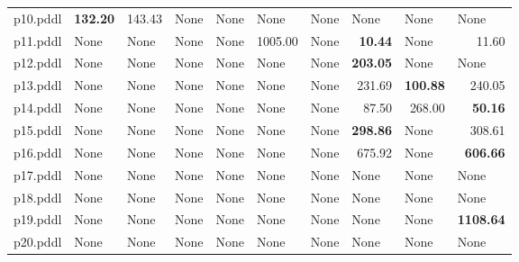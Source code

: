 \documentclass{article}
\begin{document}
\begin{tabular}{@{}lrrrrrrrrr@{}}
p10.pddl & \textbf{132.20} & 143.43 & \multicolumn{1}{|l|}{None} & \multicolumn{1}{|l|}{None} & \multicolumn{1}{|l|}{None} & \multicolumn{1}{|l|}{None} & \multicolumn{1}{|l|}{None} & \multicolumn{1}{|l|}{None} & \multicolumn{1}{|l|}{None} \\
p11.pddl & \multicolumn{1}{|l|}{None} & \multicolumn{1}{|l|}{None} & \multicolumn{1}{|l|}{None} & \multicolumn{1}{|l|}{None} & 1005.00 & \multicolumn{1}{|l|}{None} & \textbf{10.44} & \multicolumn{1}{|l|}{None} & 11.60 \\
p12.pddl & \multicolumn{1}{|l|}{None} & \multicolumn{1}{|l|}{None} & \multicolumn{1}{|l|}{None} & \multicolumn{1}{|l|}{None} & \multicolumn{1}{|l|}{None} & \multicolumn{1}{|l|}{None} & \textbf{203.05} & \multicolumn{1}{|l|}{None} & \multicolumn{1}{|l|}{None} \\
p13.pddl & \multicolumn{1}{|l|}{None} & \multicolumn{1}{|l|}{None} & \multicolumn{1}{|l|}{None} & \multicolumn{1}{|l|}{None} & \multicolumn{1}{|l|}{None} & \multicolumn{1}{|l|}{None} & 231.69 & \textbf{100.88} & 240.05 \\
p14.pddl & \multicolumn{1}{|l|}{None} & \multicolumn{1}{|l|}{None} & \multicolumn{1}{|l|}{None} & \multicolumn{1}{|l|}{None} & \multicolumn{1}{|l|}{None} & \multicolumn{1}{|l|}{None} & 87.50 & 268.00 & \textbf{50.16} \\
p15.pddl & \multicolumn{1}{|l|}{None} & \multicolumn{1}{|l|}{None} & \multicolumn{1}{|l|}{None} & \multicolumn{1}{|l|}{None} & \multicolumn{1}{|l|}{None} & \multicolumn{1}{|l|}{None} & \textbf{298.86} & \multicolumn{1}{|l|}{None} & 308.61 \\
p16.pddl & \multicolumn{1}{|l|}{None} & \multicolumn{1}{|l|}{None} & \multicolumn{1}{|l|}{None} & \multicolumn{1}{|l|}{None} & \multicolumn{1}{|l|}{None} & \multicolumn{1}{|l|}{None} & 675.92 & \multicolumn{1}{|l|}{None} & \textbf{606.66} \\
p17.pddl & \multicolumn{1}{|l|}{None} & \multicolumn{1}{|l|}{None} & \multicolumn{1}{|l|}{None} & \multicolumn{1}{|l|}{None} & \multicolumn{1}{|l|}{None} & \multicolumn{1}{|l|}{None} & \multicolumn{1}{|l|}{None} & \multicolumn{1}{|l|}{None} & \multicolumn{1}{|l|}{None} \\
p18.pddl & \multicolumn{1}{|l|}{None} & \multicolumn{1}{|l|}{None} & \multicolumn{1}{|l|}{None} & \multicolumn{1}{|l|}{None} & \multicolumn{1}{|l|}{None} & \multicolumn{1}{|l|}{None} & \multicolumn{1}{|l|}{None} & \multicolumn{1}{|l|}{None} & \multicolumn{1}{|l|}{None} \\
p19.pddl & \multicolumn{1}{|l|}{None} & \multicolumn{1}{|l|}{None} & \multicolumn{1}{|l|}{None} & \multicolumn{1}{|l|}{None} & \multicolumn{1}{|l|}{None} & \multicolumn{1}{|l|}{None} & \multicolumn{1}{|l|}{None} & \multicolumn{1}{|l|}{None} & \textbf{1108.64} \\
p20.pddl & \multicolumn{1}{|l|}{None} & \multicolumn{1}{|l|}{None} & \multicolumn{1}{|l|}{None} & \multicolumn{1}{|l|}{None} & \multicolumn{1}{|l|}{None} & \multicolumn{1}{|l|}{None} & \multicolumn{1}{|l|}{None} & \multicolumn{1}{|l|}{None} & \multicolumn{1}{|l|}{None} \\
\end{tabular}
\end{document}

